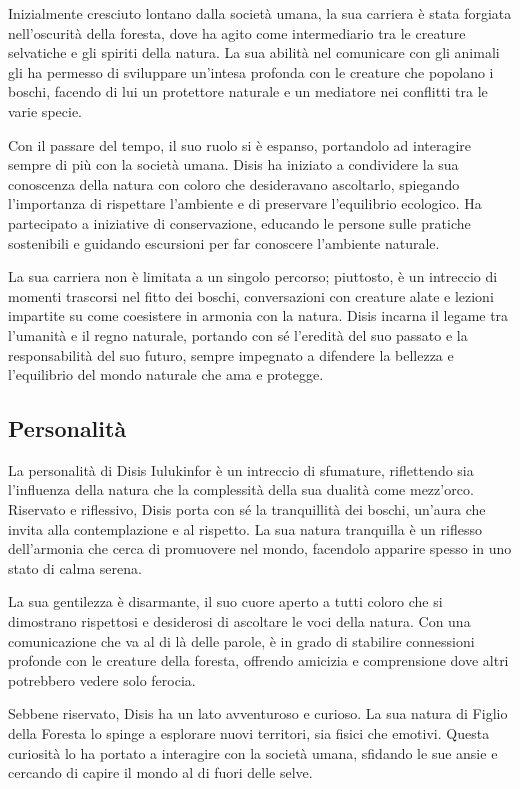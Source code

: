 Inizialmente cresciuto lontano dalla società umana, la sua carriera è
stata forgiata nell'oscurità della foresta, dove ha agito come
intermediario tra le creature selvatiche e gli spiriti della natura. La
sua abilità nel comunicare con gli animali gli ha permesso di sviluppare
un'intesa profonda con le creature che popolano i boschi, facendo di lui
un protettore naturale e un mediatore nei conflitti tra le varie specie.

Con il passare del tempo, il suo ruolo si è espanso, portandolo ad
interagire sempre di più con la società umana. Disis ha iniziato a
condividere la sua conoscenza della natura con coloro che desideravano
ascoltarlo, spiegando l'importanza di rispettare l'ambiente e di
preservare l'equilibrio ecologico. Ha partecipato a iniziative di
conservazione, educando le persone sulle pratiche sostenibili e guidando
escursioni per far conoscere l'ambiente naturale.

La sua carriera non è limitata a un singolo percorso; piuttosto, è un
intreccio di momenti trascorsi nel fitto dei boschi, conversazioni con
creature alate e lezioni impartite su come coesistere in armonia con la
natura. Disis incarna il legame tra l'umanità e il regno naturale,
portando con sé l'eredità del suo passato e la responsabilità del suo
futuro, sempre impegnato a difendere la bellezza e l'equilibrio del
mondo naturale che ama e protegge.

\subsection{Personalità}\label{personalituxe0}


La personalità di Disis Iulukinfor è un intreccio di sfumature,
riflettendo sia l'influenza della natura che la complessità della sua
dualità come mezz'orco. Riservato e riflessivo, Disis porta con sé la
tranquillità dei boschi, un'aura che invita alla contemplazione e al
rispetto. La sua natura tranquilla è un riflesso dell'armonia che cerca
di promuovere nel mondo, facendolo apparire spesso in uno stato di calma
serena.

La sua gentilezza è disarmante, il suo cuore aperto a tutti coloro che
si dimostrano rispettosi e desiderosi di ascoltare le voci della natura.
Con una comunicazione che va al di là delle parole, è in grado di
stabilire connessioni profonde con le creature della foresta, offrendo
amicizia e comprensione dove altri potrebbero vedere solo ferocia.

Sebbene riservato, Disis ha un lato avventuroso e curioso. La sua natura
di Figlio della Foresta lo spinge a esplorare nuovi territori, sia
fisici che emotivi. Questa curiosità lo ha portato a interagire con la
società umana, sfidando le sue ansie e cercando di capire il mondo al di
fuori delle selve.


